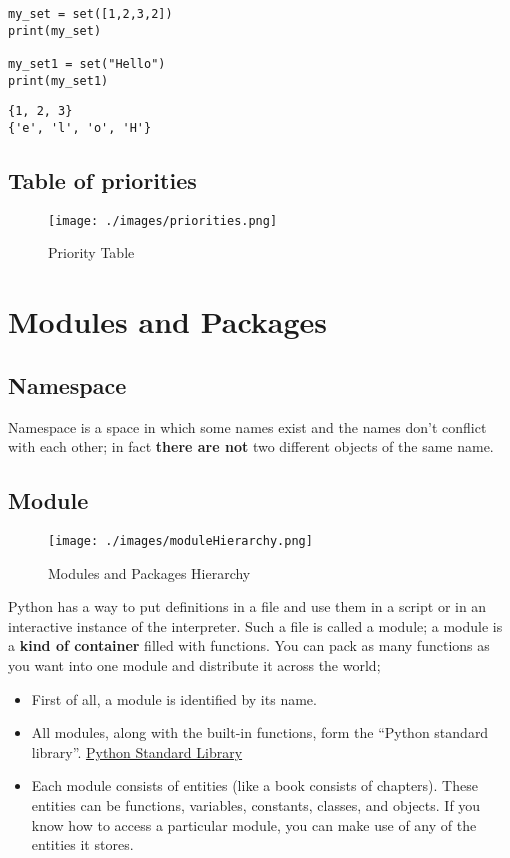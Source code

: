 \documentclass[11pt]{article}
\begin{document}
\begin{verbatim}
my_set = set([1,2,3,2])
print(my_set)

my_set1 = set("Hello")
print(my_set1)
\end{verbatim}

\begin{verbatim}
{1, 2, 3}
{'e', 'l', 'o', 'H'}
\end{verbatim}

\newpage


\subsection{Table of priorities}
\label{sec:org5a626e9}

\begin{figure}[htbp]
\centering
\texttt{[image: ./images/priorities.png]}
\caption{Priority Table}
\end{figure}

\newpage
\section{Modules and Packages}
\label{sec:orga4330e7}
\subsection{Namespace}
\label{sec:org47c4194}
Namespace is a space in which some names exist and the names don’t
conflict with each other; in fact \textbf{there are not} two different objects of the
same name.
\subsection{Module}
\label{sec:org4e62e7d}

\begin{figure}[htbp]
\centering
\texttt{[image: ./images/moduleHierarchy.png]}
\caption{Modules and Packages Hierarchy}
\end{figure}

Python has a way to put definitions in a file and use them in a script
or in an interactive instance of the interpreter. Such a file is
called a module; a module is a \textbf{kind of container} filled with
functions. You can pack as many functions as you want into one module
and distribute it across the world;

\begin{itemize}
\item First of all, a module is identified by its name.
\item All modules, along with the built-in functions, form the
“Python standard library”. \href{https://docs.python.org/3/library/index.html}{Python Standard Library}
\item Each module consists of entities (like a book consists of
chapters). These entities can be functions, variables, constants,
classes, and objects. If you know how to access a particular module,
you can make use of any of the entities it stores.
\end{itemize}
\end{document}
